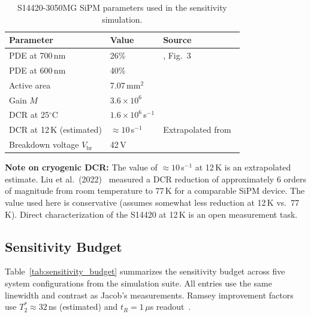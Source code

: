 \begin{table}[ht]
\centering
\caption{S14420-3050MG SiPM parameters used in the sensitivity simulation.}
\label{tab:sipm_sim_params}
\small
\begin{tabular}{@{}p{4.5cm}p{2.5cm}p{5cm}@{}}
\toprule
Parameter & Value & Source \\
\midrule
PDE at 700\,nm & 26\% & \cite{S14420datasheet}, Fig.~3 \\ %
PDE at 600\,nm & 40\% & \cite{S14420datasheet} \\ %
Active area & 7.07\,mm$^2$ & \cite{S14420datasheet} \\
Gain $M$ & $3.6 \times 10^6$ & \cite{S14420datasheet} \\
DCR at 25$^\circ$C & $1.6 \times 10^6$\,s$^{-1}$ & \cite{S14420datasheet} \\ %
DCR at 12\,K (estimated) & $\approx 10$\,s$^{-1}$ & Extrapolated from~\cite{Liu2022SiPMLN2} \\ %
Breakdown voltage $V_\mathrm{br}$ & 42\,V & \cite{S14420datasheet} \\ %
\bottomrule
\end{tabular}
\end{table}

\textbf{Note on cryogenic DCR:} The value of $\approx 10$\,s$^{-1}$ at 12\,K is an
extrapolated estimate. Liu et al.\ (2022)~\cite{Liu2022SiPMLN2} measured a DCR reduction
of approximately 6 orders of magnitude from room temperature to 77\,K for a comparable SiPM
device. The value used here is conservative (assumes somewhat less reduction at 12\,K
vs.\ 77\,K). Direct characterization of the S14420 at 12\,K is an open measurement task.

\subsection{Sensitivity Budget}
\label{sec:sensitivity_budget}

Table~\ref{tab:sensitivity_budget} summarizes the sensitivity budget across five system
configurations from the simulation suite. All entries use the same linewidth and contrast as
Jacob's measurements. Ramsey improvement factors use $T_2^* \approx 32$\,ns (estimated)
and $t_R = 1\,\mu$s readout~\cite{Barry2020}. %

